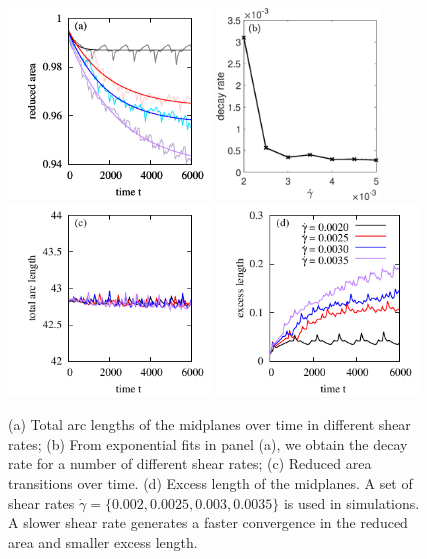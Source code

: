\documentclass[lineno]{jfm}
\begin{document}
\begin{figure}
\begin{center}
\hspace{-0.6cm}
\includegraphics[height=2in]{ReducedArea.pdf}
\hspace{0.6cm}
\includegraphics[height=2in]{DecayRate.eps}\\
\includegraphics[height=2in]{ArcLength.pdf}
\includegraphics[height=2in]{ExcLength.pdf}
\end{center} 
  \caption{(a) Total arc lengths of the midplanes over time in different shear rates; (b) From exponential fits in panel (a), we obtain the decay rate for a number of different shear rates;
  (c) Reduced area transitions over time. (d) Excess length of the midplanes.
A set of shear rates $\dot\gamma=\{0.002,0.0025,0.003,0.0035\}$ is used in simulations. 
A slower shear rate generates a faster convergence in the reduced area and smaller excess length. 
  }
    \label{figure4}
\end{figure}
\end{document}
